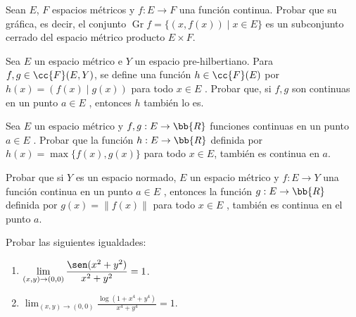 \begin{ejercicio}
    Sean $E$, $F$ espacios métricos y $f:E\to F$ una función continua. Probar que su gráfica, es decir, el conjunto $\operatorname{Gr} f = \{(x,f(x))\mid x\in E\}$ es un subconjunto cerrado del espacio métrico producto $E \times F$.
\end{ejercicio}


\begin{ejercicio}
    Sea $E$ un espacio métrico e $Y$ un espacio pre-hilbertiano. Para $f,g \in \cc{F}(E,Y)$, se define una función $h \in \cc{F}(E)$ por $h(x)=\left(f(x)\mid g(x)\right)$ para todo $x\in E$ . Probar que, si $f,g$ son continuas en un punto $a \in E$ , entonces $h$ también lo es.
\end{ejercicio}


\begin{ejercicio}
    Sea $E$ un espacio métrico y $f,g : E \to \bb{R}$ funciones continuas en un punto $a\in E$ . Probar que la función $h : E \to \bb{R}$ definida por $h(x) = \max \{f(x), g(x)\}$ para todo $x\in E$, también es continua en $a$.
\end{ejercicio}


\begin{ejercicio}
    Probar que si $Y$ es un espacio normado, $E$ un espacio métrico y $f:E \to Y$ una función continua en un punto $a \in E$ , entonces la función $g: E \to \bb{R}$ definida por $g(x)=\|f(x)\|$ para todo $x\in E$ , también es continua en el punto $a$.
\end{ejercicio}

\begin{ejercicio}
    Probar las siguientes igualdades:
    \begin{enumerate}
        \item $\displaystyle \lim_{(x,y)\to (0,0)} \frac{\sen(x^2 + y^2)}{x^2+y^2} = 1$.
        \item $\displaystyle \lim_{(x,y)\to (0,0)} \frac{\log(1+x^4 + y^4)}{x^4+y^4} = 1$.
    \end{enumerate}
\end{ejercicio}